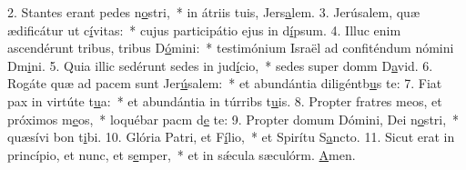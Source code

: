 2. Stantes erant pedes n\uline{o}stri,~* in átriis tuis, Jers\uline{a}lem.
3. Jerúsalem, quæ ædificátur ut c\uline{í}vitas:~* cujus participátio ejus in d\uline{í}psum.
4. Illuc enim ascendérunt tribus, tribus D\uline{ó}mini:~* testimónium Israël ad confiténdum nómini Dm\uline{i}ni.
5. Quia illic sedérunt sedes in jud\uline{í}cio,~* sedes super domm D\uline{a}vid.
6. Rogáte quæ ad pacem sunt Jer\uline{ú}salem:~* et abundántia diligéntb\uline{u}s te:
7. Fiat pax in virtúte t\uline{u}a:~* et abundántia in túrribs t\uline{u}is.
8. Propter fratres meos, et próximos m\uline{e}os,~* loquébar pacm d\uline{e} te:
9. Propter domum Dómini, Dei n\uline{o}stri,~* quæsívi bon t\uline{i}bi.
10. Glória Patri, et F\uline{í}lio,~* et Spirítu S\uline{a}ncto.
11. Sicut erat in princípio, et nunc, et s\uline{e}mper,~* et in sǽcula sæculórm. \uline{A}men.
